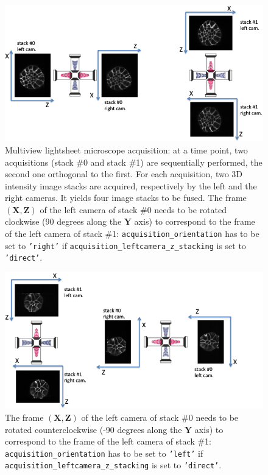 \begin{figure}
\begin{center}
\includegraphics[width=150mm]{figures/acquisition-spim-right.png}
\end{center}
\caption{\label{fig:cli:fuse:spim:right:acquisition} Multiview lightsheet microscope acquisition: at a time point, two acquisitions (stack \#0 and stack \#1) are sequentially performed, the second one orthogonal to the first. For each acquisition, two 3D intensity image stacks are acquired, respectively by the left and the right cameras. 
It yields four image stacks to be fused. 
The frame $(\mathbf{X}, \mathbf{Z})$ of the left camera of stack \#0 needs to be rotated clockwise (90 degrees along the $\mathbf{Y}$ axis) to correspond to the frame of the left camera of stack \#1: \texttt{acquisition\_orientation} has to be set to \texttt{'right'} if \texttt{acquisition\_leftcamera\_z\_stacking} is set to \texttt{'direct'}.}
\end{figure}

\begin{figure}
\begin{center}
\includegraphics[width=150mm]{figures/acquisition-spim-left.png}
\end{center}
\caption{\label{fig:cli:fuse:spim:left:acquisition} The frame $(\mathbf{X}, \mathbf{Z})$ of the left camera of stack \#0 needs to be rotated counterclockwise (-90 degrees along the $\mathbf{Y}$ axis) to correspond to the frame of the left camera of stack \#1: \texttt{acquisition\_orientation} has to be set to \texttt{'left'} if \texttt{acquisition\_leftcamera\_z\_stacking} is set to \texttt{'direct'}.}
\end{figure}



